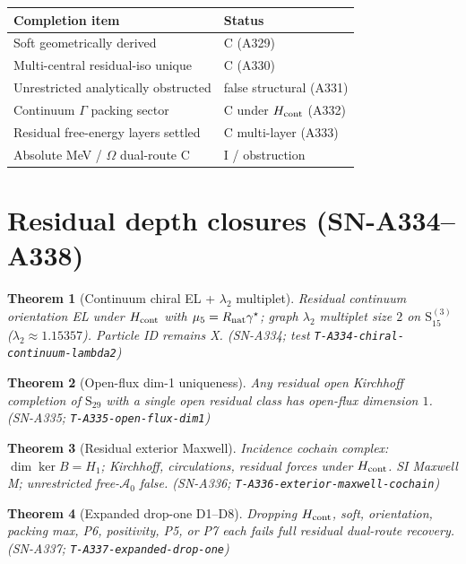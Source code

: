 \documentclass[11pt,a4paper]{article}
\newtheorem{theorem}{Theorem}
\theoremstyle{remark}
\begin{document}
\begin{center}
\begin{tabular}{@{}p{5.6cm}p{5.8cm}@{}}
\toprule
Completion item & Status \\
\midrule
Soft geometrically derived & C (A329) \\
Multi-central residual-iso unique & C (A330) \\
Unrestricted analytically obstructed & false structural (A331) \\
Continuum $\Gamma$ packing sector & C under $H_{\rm cont}$ (A332) \\
Residual free-energy layers settled & C multi-layer (A333) \\
Absolute MeV / $\Omega$ dual-route C & I / obstruction \\
\bottomrule
\end{tabular}
\end{center}


\section{Residual depth closures (SN-A334--A338)}
\label{sec:depth-A334}

\begin{theorem}[Continuum chiral EL + $\lambda_2$ multiplet]
Residual continuum orientation EL under $H_{\rm cont}$ with $\mu_5=R_{\rm nat}\gamma^\star$; graph $\lambda_2$ multiplet size $2$ on $\mathrm{S}_{15}^{(3)}$ ($\lambda_2\approx 1.15357$). Particle ID remains X. (SN-A334; test \texttt{T-A334-chiral-continuum-lambda2})
\end{theorem}

\begin{theorem}[Open-flux dim-1 uniqueness]
Any residual open Kirchhoff completion of $\mathrm{S}_{29}$ with a single open residual class has open-flux dimension $1$. (SN-A335; \texttt{T-A335-open-flux-dim1})
\end{theorem}

\begin{theorem}[Residual exterior Maxwell]
Incidence cochain complex: $\dim\ker B=H_1$; Kirchhoff, circulations, residual forces under $H_{\rm cont}$. SI Maxwell M; unrestricted free-$\mathcal{A}_0$ false. (SN-A336; \texttt{T-A336-exterior-maxwell-cochain})
\end{theorem}

\begin{theorem}[Expanded drop-one D1--D8]
Dropping $H_{\rm cont}$, soft, orientation, packing max, P6, positivity, P5, or P7 each fails full residual dual-route recovery. (SN-A337; \texttt{T-A337-expanded-drop-one})
\end{theorem}
\end{document}

